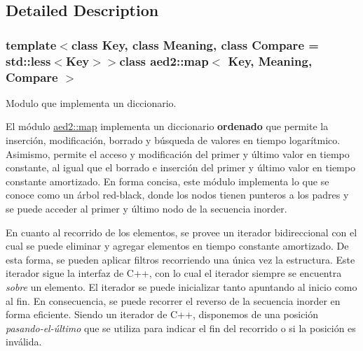 \subsection{\-Detailed \-Description}
\subsubsection*{template$<$class \-Key, class \-Meaning, class \-Compare = std\-::less$<$\-Key$>$$>$class aed2\-::map$<$ Key, Meaning, Compare $>$}

\-Modulo que implementa un diccionario. 

\-El módulo \hyperlink{classaed2_1_1map}{aed2\-::map} implementa un diccionario {\bfseries ordenado} que permite la inserción, modificación, borrado y búsqueda de valores en tiempo logarítmico. \-Asimismo, permite el acceso y modificación del primer y último valor en tiempo constante, al igual que el borrado e inserción del primer y último valor en tiempo constante amortizado. \-En forma concisa, este módulo implementa lo que se conoce como un árbol red-\/black, donde los nodos tienen punteros a los padres y se puede acceder al primer y último nodo de la secuencia inorder.

\-En cuanto al recorrido de los elementos, se provee un iterador bidireccional con el cual se puede eliminar y agregar elementos en tiempo constante amortizado. \-De esta forma, se pueden aplicar filtros recorriendo una única vez la estructura. \-Este iterador sigue la interfaz de \-C++, con lo cual el iterador siempre se encuentra {\itshape sobre\/} un elemento. \-El iterador se puede inicializar tanto apuntando al inicio como al fin. \-En consecuencia, se puede recorrer el reverso de la secuencia inorder en forma eficiente. \-Siendo un iterador de \-C++, disponemos de una posición {\itshape pasando-\/el-\/último\/} que se utiliza para indicar el fin del recorrido o si la posición es inválida.


